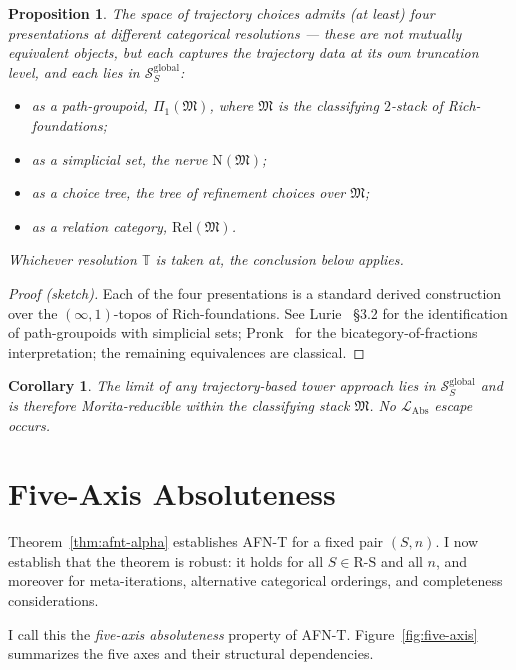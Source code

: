 \documentclass[11pt]{article}
\theoremstyle{plain}
\newtheorem{proposition}[theorem]{Proposition}
\newtheorem{corollary}[theorem]{Corollary}
\theoremstyle{definition}
\newcommand{\RS}{\mathrm{R\text{-}S}}
\newcommand{\cS}{\mathcal{S}}
\newcommand{\fM}{\mathfrak{M}}
\newcommand{\LAbs}{\mathcal{L}_{\mathrm{Abs}}}
\begin{document}
\begin{proposition}\label{prop:trajectory-space}
The space of trajectory choices admits (at least) four presentations at different categorical resolutions --- these are \emph{not} mutually equivalent objects, but each captures the trajectory data at its own truncation level, and \emph{each} lies in $\cS_S^{\mathrm{global}}$:
\begin{itemize}
\item as a path-groupoid, $\Pi_1(\fM)$, where $\fM$ is the classifying $2$-stack of Rich-foundations;
\item as a simplicial set, the nerve $\mathrm{N}(\fM)$;
\item as a choice tree, the tree of refinement choices over $\fM$;
\item as a relation category, $\mathrm{Rel}(\fM)$.
\end{itemize}
Whichever resolution $\mathbb{T}$ is taken at, the conclusion below applies.
\end{proposition}

\begin{proof}[Proof (sketch)]
Each of the four presentations is a standard derived construction over the $(\infty, 1)$-topos of Rich-foundations. See Lurie~\cite{LurieHTT} \S 3.2 for the identification of path-groupoids with simplicial sets; Pronk~\cite{Pronk1996} for the bicategory-of-fractions interpretation; the remaining equivalences are classical.
\end{proof}

\begin{corollary}
The limit of any trajectory-based tower approach lies in $\cS_S^{\mathrm{global}}$ and is therefore Morita-reducible within the classifying stack $\fM$. No $\LAbs$ escape occurs.
\end{corollary}

\section{Five-Axis Absoluteness}\label{sec:five-axis}

Theorem~\ref{thm:afnt-alpha} establishes AFN-T for a fixed pair $(S, n)$. I now establish that the theorem is robust: it holds for all $S \in \RS$ and all $n$, and moreover for meta-iterations, alternative categorical orderings, and completeness considerations.

I call this the \emph{five-axis absoluteness} property of AFN-T. Figure~\ref{fig:five-axis} summarizes the five axes and their structural dependencies.
\end{document}
